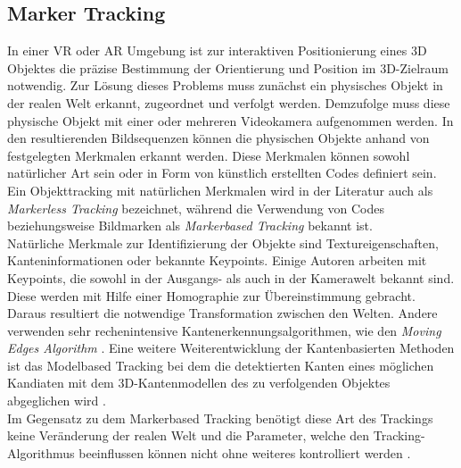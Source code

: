 \subsection{Marker Tracking} \label{sec:MarkerTracking}
In einer VR oder AR Umgebung ist zur interaktiven Positionierung eines 3D Objektes die präzise Bestimmung der Orientierung und Position im 3D-Zielraum notwendig. Zur Lösung dieses Problems muss zunächst ein physisches Objekt in der realen Welt erkannt, zugeordnet und verfolgt werden. Demzufolge muss diese physische Objekt mit einer oder mehreren Videokamera aufgenommen werden. In den resultierenden Bildsequenzen können die physischen Objekte anhand von festgelegten Merkmalen erkannt werden. Diese Merkmalen können sowohl natürlicher Art sein oder in Form von künstlich erstellten Codes definiert sein. Ein Objekttracking mit natürlichen Merkmalen wird in der Literatur auch als \textit{Markerless Tracking} bezeichnet, während die Verwendung von Codes beziehungsweise Bildmarken als \textit{Markerbased Tracking} bekannt ist.\\
Natürliche Merkmale zur Identifizierung der Objekte sind Textureigenschaften, Kanteninformationen oder bekannte Keypoints. Einige Autoren \cite{article:MarkerLessBarandiaran2010}\cite{article:MarkerLessWagner:}\cite{article:MarkerLessComport}\cite{article:MarkerLessLowe} arbeiten mit Keypoints, die sowohl in der Ausgangs- als auch in der Kamerawelt bekannt sind. Diese werden mit Hilfe einer Homographie zur Übereinstimmung gebracht. Daraus resultiert die notwendige Transformation zwischen den Welten. Andere verwenden sehr rechenintensive Kantenerkennungsalgorithmen, wie den \textit{Moving Edges Algorithm} \cite{article:MarkerLessEdgeMarchand}. Eine weitere Weiterentwicklung der Kantenbasierten Methoden ist das Modelbased Tracking bei dem die detektierten Kanten eines möglichen Kandiaten mit dem 3D-Kantenmodellen des zu verfolgenden Objektes abgeglichen wird \cite{article:MarkerLessModellVacchetti}\cite{article:MarkerLessEdgeAlvarez}\cite{article:MarkerLessEdgeWu}\cite{article:MarkerLessBlasko}. \\
Im Gegensatz zu dem Markerbased Tracking benötigt diese Art des Trackings keine Veränderung der realen Welt und die Parameter, welche den Tracking-Algorithmus beeinflussen können nicht ohne weiteres kontrolliert werden \cite{article:MarkerLessBarandiaran2010}.


